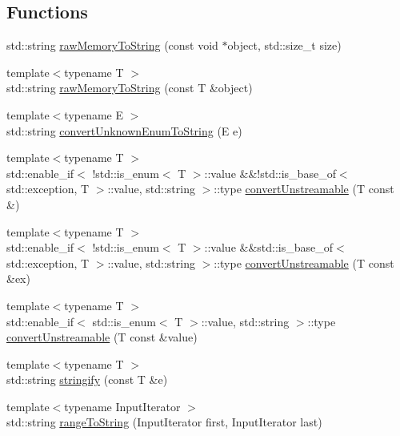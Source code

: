 \subsection*{Functions}
\begin{DoxyCompactItemize}
\item 
std\+::string \mbox{\hyperlink{namespace_catch_1_1_detail_ac5d6c510e565ee5bddcc2236194ce29e}{raw\+Memory\+To\+String}} (const void $\ast$object, std\+::size\+\_\+t size)
\item 
{\footnotesize template$<$typename T $>$ }\\std\+::string \mbox{\hyperlink{namespace_catch_1_1_detail_a371620ed524abfcae5c3772bf49b563a}{raw\+Memory\+To\+String}} (const T \&object)
\item 
{\footnotesize template$<$typename E $>$ }\\std\+::string \mbox{\hyperlink{namespace_catch_1_1_detail_a242396de537c5176710d680cc9ca6b93}{convert\+Unknown\+Enum\+To\+String}} (E e)
\item 
{\footnotesize template$<$typename T $>$ }\\std\+::enable\+\_\+if$<$ !std\+::is\+\_\+enum$<$ T $>$\+::value \&\&!std\+::is\+\_\+base\+\_\+of$<$ std\+::exception, T $>$\+::value, std\+::string $>$\+::type \mbox{\hyperlink{namespace_catch_1_1_detail_a8e765acd7fc9eabdc34c786014cf02cd}{convert\+Unstreamable}} (T const \&)
\item 
{\footnotesize template$<$typename T $>$ }\\std\+::enable\+\_\+if$<$ !std\+::is\+\_\+enum$<$ T $>$\+::value \&\&std\+::is\+\_\+base\+\_\+of$<$ std\+::exception, T $>$\+::value, std\+::string $>$\+::type \mbox{\hyperlink{namespace_catch_1_1_detail_aa5db7cae49c34a5e656be39ea52dbe22}{convert\+Unstreamable}} (T const \&ex)
\item 
{\footnotesize template$<$typename T $>$ }\\std\+::enable\+\_\+if$<$ std\+::is\+\_\+enum$<$ T $>$\+::value, std\+::string $>$\+::type \mbox{\hyperlink{namespace_catch_1_1_detail_abcc3139c8a868a369402e546045fbfb8}{convert\+Unstreamable}} (T const \&value)
\item 
{\footnotesize template$<$typename T $>$ }\\std\+::string \mbox{\hyperlink{namespace_catch_1_1_detail_af0ad48344ffd3f92f3568465248a9880}{stringify}} (const T \&e)
\item 
{\footnotesize template$<$typename Input\+Iterator $>$ }\\std\+::string \mbox{\hyperlink{namespace_catch_1_1_detail_a6650a1dff325bf29962ff15ae73fd972}{range\+To\+String}} (Input\+Iterator first, Input\+Iterator last)
\end{DoxyCompactItemize}
